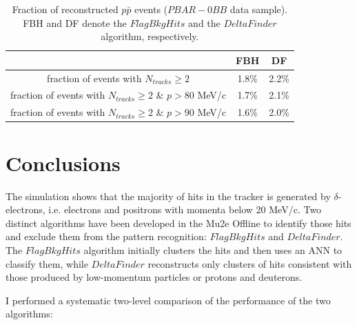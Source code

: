 \begin{center}
        \begin{table}[h!]
        \centering
        \renewcommand{\arraystretch}{1.}
        \begin{tabular}{| c | c | c |} 
            \hline
            &  FBH & DF\\
            \hline
            fraction of events with $N_{tracks} \geq 2$ &  1.8\% & 2.2\%\\
            \hline
            fraction of events with $N_{tracks} \geq 2$ \& $p>$80 MeV/c & 1.7\% & 2.1\%\\
            \hline
            fraction of events with $N_{tracks} \geq 2$ \& $p>$90 MeV/c & 1.6\% & 2.0\%\\
            \hline
            \end{tabular}
        \caption{Fraction of reconstructed $p\bar{p}$ events 
        ($PBAR-0BB$ data sample). FBH and DF denote the $FlagBkgHits$ and the $DeltaFinder$ algorithm, respectively.}
        \label{tab:recoeffpbar}
        \end{table}
\end{center}

\section{Conclusions}
The simulation shows that the majority 
of hits in the tracker is 
generated by $\delta$-electrons, i.e. electrons 
and positrons with momenta below 20 MeV/c. 
Two distinct algorithms have been developed in the Mu2e Offline to 
identify those hits and exclude them from the pattern recognition: 
$FlagBkgHits$ and $DeltaFinder$. 
The $FlagBkgHits$ algorithm initially clusters the hits and then uses an ANN 
to classify them, while $DeltaFinder$ reconstructs only clusters of hits  
consistent with those produced by low-momentum particles or protons and deuterons.

I performed a systematic two-level comparison of the performance of the two algorithms:

